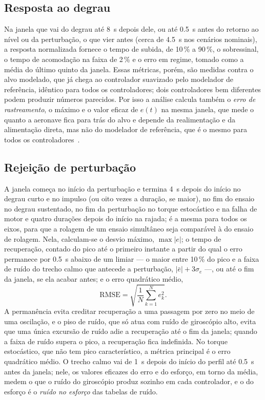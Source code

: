 \subsection{Resposta ao degrau}

Na janela que vai do degrau até
\SI{8}{\second} depois dele, ou até \SI{0.5}{\second} antes do retorno ao
nível ou da perturbação, o que vier antes (cerca de \SI{4.5}{\second} nos
cenários nominais), a resposta normalizada fornece o tempo de subida, de
10\,\% a 90\,\%, o sobressinal, o tempo de acomodação na faixa de 2\,\% e o
erro em regime, tomado como a média do último quinto da janela. Essas
métricas, porém, são medidas contra o alvo modelado, que já chega ao
controlador suavizado pelo modelador de referência, idêntico para todos os
controladores; dois controladores bem diferentes podem produzir números
parecidos. Por isso a análise calcula também o \emph{erro de rastreamento},
o máximo e o valor eficaz de $e(t)$ na mesma janela, que mede o quanto a
aeronave fica para trás do alvo e depende da realimentação e da alimentação
direta, mas não do modelador de referência, que é o mesmo para todos os
controladores~\cite{astrom2008}.

\subsection{Rejeição de perturbação}

A janela começa no início da
perturbação e termina \SI{4}{\second} depois do início no degrau curto e no
impulso (ou oito vezes a duração, se maior), no fim do ensaio no degrau sustentado, no fim
da perturbação no torque estocástico e na falha de motor e quatro durações
depois do início na rajada; é a mesma para todos os eixos,
para que a rolagem de um ensaio simultâneo seja comparável à do ensaio de
rolagem. Nela, calculam-se o desvio máximo, $\max|e|$; o tempo de
recuperação, contado do pico até o primeiro instante a partir do qual o erro
permanece por \SI{0.5}{\second} abaixo de um limiar --- o maior entre
10\,\% do pico e a faixa de ruído do trecho calmo que antecede a
perturbação, $|\bar e| + 3\sigma_e$ ---, ou até o fim da janela, se ela
acabar antes; e o erro quadrático médio,
\begin{equation}
\mathrm{RMSE} = \sqrt{\frac{1}{N}\sum_{k=1}^{N} e_k^2}.
\label{eq:rmse}
\end{equation}
A permanência evita creditar recuperação a uma passagem por zero no meio de
uma oscilação, e o piso de ruído, que só atua com ruído de giroscópio alto,
evita que uma única excursão de ruído adie a recuperação até o fim da janela;
quando a faixa de ruído supera o pico, a recuperação fica indefinida. No
torque estocástico, que não tem pico característico, a métrica principal é o
erro quadrático médio. O trecho calmo vai de \SI{1}{\second} depois do
início do perfil até \SI{0.5}{\second} antes da janela; nele, os valores
eficazes do erro e do esforço, em torno da média, medem o que o ruído do
giroscópio produz sozinho em cada controlador, e o do esforço é o
\emph{ruído no esforço} das tabelas de ruído.

